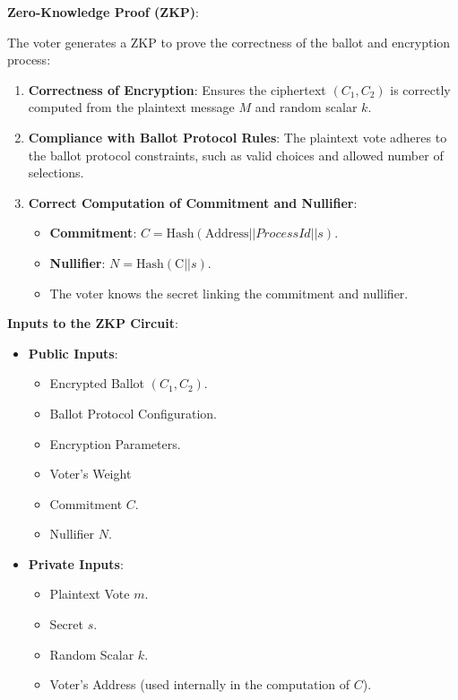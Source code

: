 \begin{enumerate}
	
	\textbf{Zero-Knowledge Proof (ZKP)}:
	
	The voter generates a ZKP to prove the correctness of the ballot and encryption process:
	
	\begin{enumerate}
		\item \textbf{Correctness of Encryption}: Ensures the ciphertext $(C_1, C_2)$ is correctly computed from the plaintext message $M$ and random scalar $k$.
		\item \textbf{Compliance with Ballot Protocol Rules}: The plaintext vote adheres to the ballot protocol constraints, such as valid choices and allowed number of selections.
		\item \textbf{Correct Computation of Commitment and Nullifier}:
		\begin{itemize}
			\item \textbf{Commitment}: $C = \text{Hash} (\text{Address} || ProcessId || s).$
			\item \textbf{Nullifier}: $N = \text{Hash}(\text{C} || s)$.
			\item The voter knows the secret linking the commitment and nullifier.
		\end{itemize}
	\end{enumerate}
	
	\textbf{Inputs to the ZKP Circuit}:
	
	\begin{itemize}
		\item \textbf{Public Inputs}:
		\begin{itemize}
			\item Encrypted Ballot $(C_1, C_2)$.
			\item Ballot Protocol Configuration.
			\item Encryption Parameters.
			\item Voter's Weight
			\item Commitment $C$.
			\item Nullifier $N$.
		\end{itemize}
		\item \textbf{Private Inputs}:
		\begin{itemize}
			\item Plaintext Vote $m$.
			\item Secret $s$.
			\item Random Scalar $k$.
			\item Voter's Address (used internally in the computation of $C$).
		\end{itemize}
	\end{itemize}
	

\end{enumerate}

